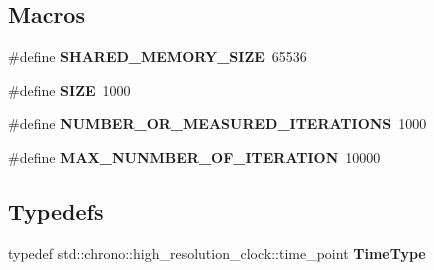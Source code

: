 \subsection*{Macros}
\begin{DoxyCompactItemize}
\item 
\mbox{\label{benchmark__common_8hh_a21a16aec41293c80beb10d71f79ad7a2}} 
\#define {\bfseries S\+H\+A\+R\+E\+D\+\_\+\+M\+E\+M\+O\+R\+Y\+\_\+\+S\+I\+ZE}~65536
\item 
\mbox{\label{benchmark__common_8hh_a70ed59adcb4159ac551058053e649640}} 
\#define {\bfseries S\+I\+ZE}~1000
\item 
\mbox{\label{benchmark__common_8hh_adf00b55c2043a89ad0ac69b3a2428281}} 
\#define {\bfseries N\+U\+M\+B\+E\+R\+\_\+\+O\+R\+\_\+\+M\+E\+A\+S\+U\+R\+E\+D\+\_\+\+I\+T\+E\+R\+A\+T\+I\+O\+NS}~1000
\item 
\mbox{\label{benchmark__common_8hh_adc5fa90d9af8c15b5dc4c72697821c36}} 
\#define {\bfseries M\+A\+X\+\_\+\+N\+U\+N\+M\+B\+E\+R\+\_\+\+O\+F\+\_\+\+I\+T\+E\+R\+A\+T\+I\+ON}~10000
\end{DoxyCompactItemize}
\subsection*{Typedefs}
\begin{DoxyCompactItemize}
\item 
\mbox{\label{benchmark__common_8hh_ac3379ce076aff9d7667b3fc267a87f48}} 
typedef std\+::chrono\+::high\+\_\+resolution\+\_\+clock\+::time\+\_\+point {\bfseries Time\+Type}
\end{DoxyCompactItemize}
